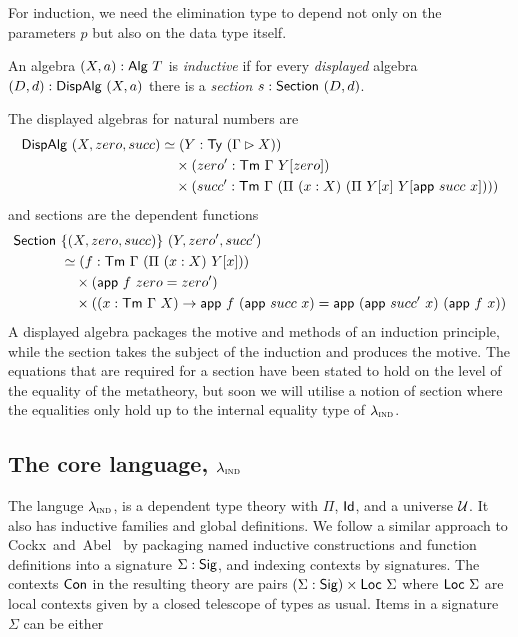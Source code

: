 For induction, we need the elimination type to depend not only on the parameters $p$
but also on the data type itself.
\begin{definition}
	An algebra $(X, a) : \textsf{Alg}\ T$ is \emph{inductive} if for every
	\emph{displayed} algebra $(D, d) : \textsf{DispAlg}\ (X, a)$ there is a
	\emph{section} $s : \textsf{Section}\ (D, d)$.
\end{definition}
The displayed algebras for natural numbers are
\begin{align*}
	\mta{DispAlg}\ (X, zero, succ) & \simeq (Y : \Ty\ (\Gamma \rhd X))                                                      \\
	                               & \quad \times (zero' : \Tm\ \Gamma\ Y[zero])                                            \\
	                               & \quad \times (succ' : \Tm\ \Gamma\ (\Pi\ (x : X)\ (\Pi\ Y[x]\ Y[\mta{app}\ succ\ x])))
\end{align*}
and sections are the dependent functions
\begin{align*}
	\mta{Section}\  & \{(X, zero, succ)\}\ (Y, zero', succ')                                                                                           \\
	                & \simeq (f : \Tm\ \Gamma\ (\Pi\ (x : X)\ Y[x]))                                                                                   \\
	                & \quad \times (\mta{app}\ f\ zero = zero')                                                                                        \\
	                & \quad \times ((x : \Tm\ \Gamma\ X) \to \mta{app}\ f\ (\mta{app}\ succ\ x) = \mta{app}\ (\mta{app}\ succ'\ x)\ (\mta{app}\ f\ x))
\end{align*}
A displayed algebra packages the motive and methods of an induction principle, while the
section takes the subject of the induction and produces the motive.
The equations that are required for a section have been stated to hold on the level of the
equality of the metatheory, but soon we will utilise a notion of section where the equalities
only hold up to the internal equality type of $\lambda_{\textsc{ind}}$.

\subsection{The core language, $\lambda_{\textsc{ind}}$}

The languge $\lambda_{\textsc{ind}}$, is a dependent type theory with $\Pi$, $\textsf{Id}$, and
a universe $\mathcal{U}$.
It also has inductive families and global definitions. We follow a similar
approach to Cockx~and~Abel~\cite{Cockx2018-fk} by packaging named inductive
constructions and function definitions into a signature $\Sigma : \textsf{Sig}$, and
indexing contexts by signatures. The contexts $\textsf{Con}$ in the resulting theory are
pairs $(\Sigma : \textsf{Sig}) \times \textsf{Loc}\ \Sigma$ where $\Loc\ \Sigma$ are local
contexts given by a closed telescope of types as usual. Items in a signature
$\Sigma$ can be either

